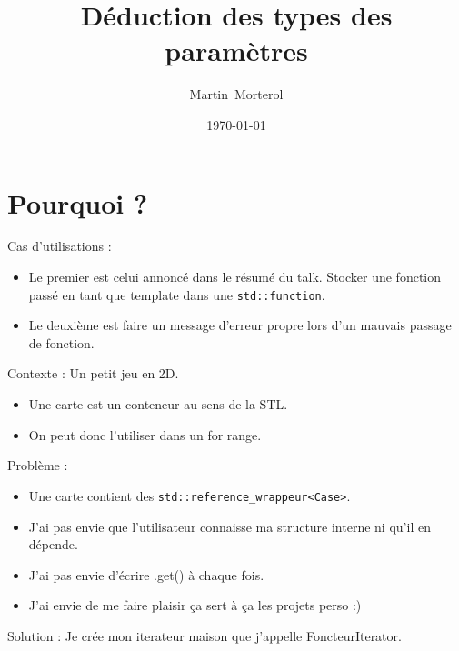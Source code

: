 \documentclass{beamer}
\title{Déduction des types des paramètres}
\author{Martin~Morterol}
\date{\today}
\begin{document}
\begin{frame}[plain]
\titlepage
\end{frame}

\section{Pourquoi ?}
\begin{frame}
	Cas d'utilisations : 
	\begin{itemize}
		\item Le premier est celui annoncé dans le résumé du talk. Stocker une fonction passé en tant que template dans une \lstinline{std::function}.
		\item Le deuxième est faire un message d'erreur propre lors d'un mauvais passage de fonction.
	\end{itemize}
\end{frame}
\begin{frame}
	Contexte : Un petit jeu en 2D.
    \begin{itemize}
    	\item Une carte est un conteneur au sens de la STL.
    	\item On peut donc l'utiliser dans un for range.
    \end{itemize}
    Problème : 
    \begin{itemize}
    	\item Une carte contient des \lstinline{std::reference_wrappeur<Case>}.
    	\item J'ai pas envie que l'utilisateur connaisse ma structure interne ni qu'il en dépende.
    	\item J'ai pas envie d’écrire .get() à chaque fois. 
    	\item J'ai envie de me faire plaisir ça sert à ça les projets perso :)
    \end{itemize}
    Solution : Je crée mon iterateur maison que j'appelle FoncteurIterator.
    
\end{frame}
\end{document}
